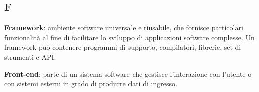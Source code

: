 \subsection{F}
\item \textbf{Framework}: ambiente software universale e riusabile, che fornisce particolari funzionalità al fine di facilitare lo sviluppo di applicazioni software complesse. Un framework può contenere programmi di supporto, compilatori, librerie, set di strumenti e API.
\item \textbf{Front-end}: parte di un sistema software che gestisce l'interazione con l'utente o con sistemi esterni in grado di produrre dati di ingresso.